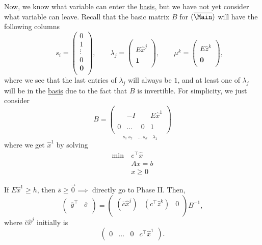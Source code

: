 Now, we know what variable can enter the \hyperref[def:basis]{basis}, but we have not yet consider what variable can leave. Recall that the basic matrix \(B\) for \((\overline{\Main})\) will have the following columns
\[
	\qquad s_{i} = \begin{pmatrix}
		0      \\
		1      \\
		\vdots \\
		0      \\
		\bm{0} \\
	\end{pmatrix}, \qquad \lambda_{j} = \begin{pmatrix}
		\\
		E \hat{x}^j \\
		\\
		\bm{1}      \\
	\end{pmatrix}, \qquad \mu^k =\begin{pmatrix}
		\\
		E \hat{z}^k \\
		\\
		\bm{0}      \\
	\end{pmatrix},
\]
where we see that the last entries of \(\lambda_{j}\) will always be \(1\), and at least one of \(\lambda_{j}\) will be in the \hyperref[def:basis]{basis} due to the fact that \(B\) is invertible. For simplicity, we just consider
\[
	B = \underset{s_1\ s_2\quad \dots\ s_k\quad \lambda_1}{
		\begin{pmatrix}
			  &       &   &             \\
			  & -I    &   & E \hat{x}^1 \\
			  &       &   &             \\
			0 & \dots & 0 & 1           \\
		\end{pmatrix}}
\]
where we get \(\hat{x}^1\) by solving
\[
	\begin{aligned}
		\min~ & e^{\top}\hat{x} \\
		      & Ax = b          \\
		      & x\geq 0
	\end{aligned}
\]

If \(E \hat{x}^1\geq h\), then \(\overline{s}\geq \vec{0}\implies\) directly go to Phase II. Then,
\[
	\begin{pmatrix}
		\overline{y}^{\top} & \overline{\sigma} \\
	\end{pmatrix} = \begin{pmatrix}
		(\overline{c}\hat{x}^j) & (c^{\top}\hat{z}^k) & 0 \\
	\end{pmatrix}B^{-1},
\]
where \(\overline{c}\hat{x}^j\) initially is
\[
	\begin{pmatrix}
		0 & \dots & 0 & c^{\top}\hat{x}^1 \\
	\end{pmatrix}.
\]

